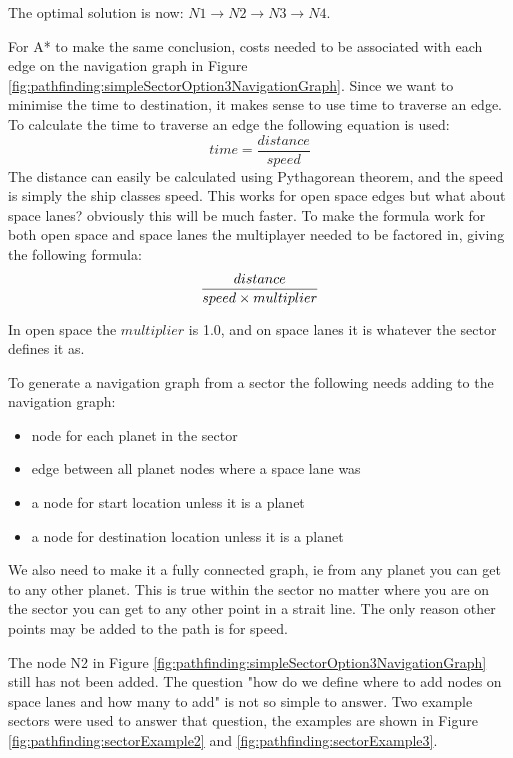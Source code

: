 The optimal solution is now: $N1 \to N2 \to N3 \to N4$.

For A* to make the same conclusion, costs needed to be associated with each edge on the navigation graph in Figure \ref{fig:pathfinding:simpleSectorOption3NavigationGraph}.
Since we want to minimise the time to destination, it makes sense to use time to traverse an edge.
To calculate the time to traverse an edge the following equation is used:
$$ time = \frac{distance}{speed} $$
The distance can easily be calculated using Pythagorean theorem, and the speed is simply the ship classes speed.
This works for open space edges but what about space lanes? obviously this will be much faster.
To make the formula work for both open space and space lanes the multiplayer needed to be factored in, giving the following formula:
\begin{equation} \label{eq:pathfinding:cost}
\frac{distance}{speed \times multiplier} $$
\end{equation}

In open space the $multiplier$ is 1.0, and on space lanes it is whatever the sector defines it as.

To generate a navigation graph from a sector the following needs adding to the navigation graph:
\begin{itemize}
\item node for each planet in the sector
\item edge between all planet nodes where a space lane was
\item a node for start location unless it is a planet
\item a node for destination location unless it is a planet
\end{itemize}

We also need to make it a fully connected graph, ie from any planet you can get to any other planet.
This is true within the sector no matter where you are on the sector you can get to any other point in a strait line. 
The only reason other points may be added to the path is for speed.

The node N2 in Figure \ref{fig:pathfinding:simpleSectorOption3NavigationGraph} still has not been added.
The question "how do we define where to add nodes on space lanes and how many to add" is not so simple to answer.
Two example sectors were used to answer that question, the examples are shown in Figure \ref{fig:pathfinding:sectorExample2} and \ref{fig:pathfinding:sectorExample3}.

